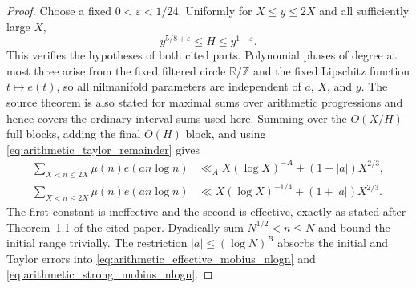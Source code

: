 \documentclass[11pt]{amsart}
\numberwithin{equation}{section}\setcounter{tocdepth}{3}\setcounter{secnumdepth}{3}
\begin{document}
\begin{proof}
Choose a fixed $0<\varepsilon<1/24$.  Uniformly for $X\le y\le2X$ and all
sufficiently large $X$,
\begin{equation}
 y^{5/8+\varepsilon}\le H\le y^{1-\varepsilon}.
 \label{eq:arithmetic_short_interval_range}
\end{equation}
This verifies the hypotheses of both cited parts.  Polynomial phases of degree at most
three arise from the fixed filtered circle $\mathbb R/\mathbb Z$ and the fixed
Lipschitz function $t\mapsto e(t)$, so all nilmanifold parameters are independent of
$a$, $X$, and $y$.  The source theorem is also stated for maximal sums over arithmetic
progressions and hence covers the ordinary interval sums used here.  Summing over the
$O(X/H)$ full blocks, adding the final $O(H)$ block, and using
\eqref{eq:arithmetic_taylor_remainder} gives
\begin{align}
 \sum_{X<n\le2X}\mu(n)e(a n\log n)
 &\ll_A X(\log X)^{-A}+(1+|a|)X^{2/3},
 \label{eq:arithmetic_dyadic_mobius_strong}\\
 \sum_{X<n\le2X}\mu(n)e(a n\log n)
 &\ll X(\log X)^{-1/4}+(1+|a|)X^{2/3}.
 \label{eq:arithmetic_dyadic_mobius_effective}
\end{align}
The first constant is ineffective and the second is effective, exactly as stated after
Theorem~1.1 of the cited paper.  Dyadically sum $N^{1/2}<n\le N$ and bound the initial
range trivially.  The restriction $|a|\le(\log N)^B$ absorbs the initial and Taylor
errors into \eqref{eq:arithmetic_effective_mobius_nlogn} and
\eqref{eq:arithmetic_strong_mobius_nlogn}.
\end{proof}
\end{document}
